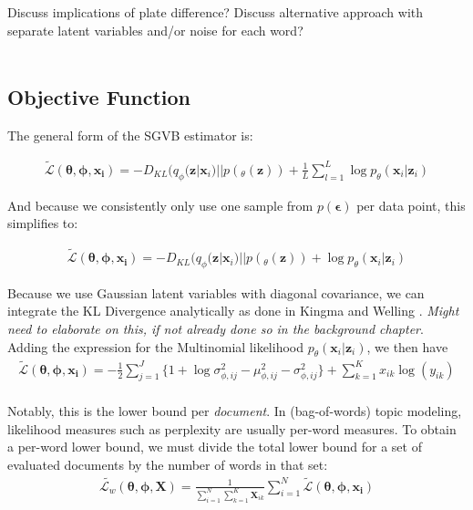 \documentclass{report}
\begin{document}
Discuss implications of plate difference? Discuss alternative approach with separate latent variables and/or noise for each word?\\ \\

\subsection{Objective Function}
The general form of the SGVB estimator is:

\begin{align}
\tilde{\mathcal{L}}(\boldsymbol{\theta}, \boldsymbol{\phi}, \mathbf{x_i}) = -D_{KL}(q_\phi (\mathbf{z}|\mathbf{x}_i)||p(_\theta(\mathbf{z}))  + \frac{1}{L}\sum_{l=1}^{L}\log p_\theta(\mathbf{x}_i|\mathbf{z}_i)
\end{align}

And because we consistently only use one sample from $p(\boldsymbol{\epsilon})$ per data point, this simplifies to:

\begin{align}\label{lb_summary}
\tilde{\mathcal{L}}(\boldsymbol{\theta}, \boldsymbol{\phi}, \mathbf{x_i}) = -D_{KL}(q_\phi (\mathbf{z}|\mathbf{x}_i)||p(_\theta(\mathbf{z}))  + \log p_\theta(\mathbf{x}_i|\mathbf{z}_i)
\end{align}

Because we use Gaussian latent variables with diagonal covariance, we can integrate the KL Divergence analytically as done in Kingma and Welling \cite{kingma2013auto}. \textit{Might need to elaborate on this, if not already done so in the background chapter}. Adding the expression for the Multinomial likelihood $p_\theta(\mathbf{x}_i|\mathbf{z}_i)$, we then have
\begin{align}\label{LBest}
\tilde{\mathcal{L}}(\boldsymbol{\theta}, \boldsymbol{\phi}, \mathbf{x_i}) = - \frac{1}{2}\sum\limits_{j=1}^{J}\{1+\log \sigma_{\phi ,ij}^2 - \mu_{\phi,ij}^2 - \sigma_{\phi ,ij}^2\}  + 
\sum_{k=1}^K x_{ik} \log (y_{ik})
\end{align}
\\
Notably, this is the lower bound per \textit{document}. In (bag-of-words) topic modeling, likelihood measures such as perplexity are usually per-word measures. To obtain a per-word lower bound, we must divide the total lower bound for a set of evaluated documents by the number of words in that set: 
\begin{align}\label{perwordLBest}
\tilde{\mathcal{L}_w}(\boldsymbol{\theta}, \boldsymbol{\phi}, \mathbf{X}) = \frac{1}{\sum\limits_{i=1}^{N}\sum\limits_{k=1}^{K}\mathbf{X}_{ik}}\sum\limits_{i=1}^N \tilde{\mathcal{L}}(\boldsymbol{\theta}, \boldsymbol{\phi}, \mathbf{x_i})
\end{align}
\end{document}
